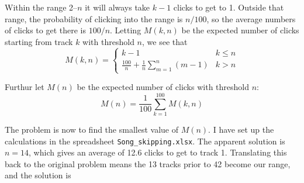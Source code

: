 \documentclass{article}
\begin{document}
Within the range 2--$n$ it will always take $k-1$ clicks to get to 1.
Outside that range, the probability of clicking into the range is $n/100$, so the average numbers of clicks to get there is $100/n$.
Letting $M(k,n)$ be the expected number of clicks starting from track $k$ with threshold $n$, we see that
\begin{equation*}
M(k,n)=
\begin{cases}
k-1 & k\leq n \\
\frac{100}{n}+\frac{1}{n}\sum\limits_{m=1}^{n}(m-1) & k>n
\end{cases}
\end{equation*}

Furthur let $M(n)$ be the expected number of clicks with threshold $n$:
\begin{equation*}
M(n)=\frac{1}{100}\sum\limits_{k=1}^{100}M(k,n)
\end{equation*}

The problem is now to find the smallest value of $M(n)$.
I have set up the calculations in the spreadsheet \texttt{Song\_skipping.xlsx}.
The apparent solution is $n=14$, which gives an average of 12.6 clicks to get to track 1.
Translating this back to the original problem means the 13 tracks prior to 42 become our range, and the solution is
\end{document}
